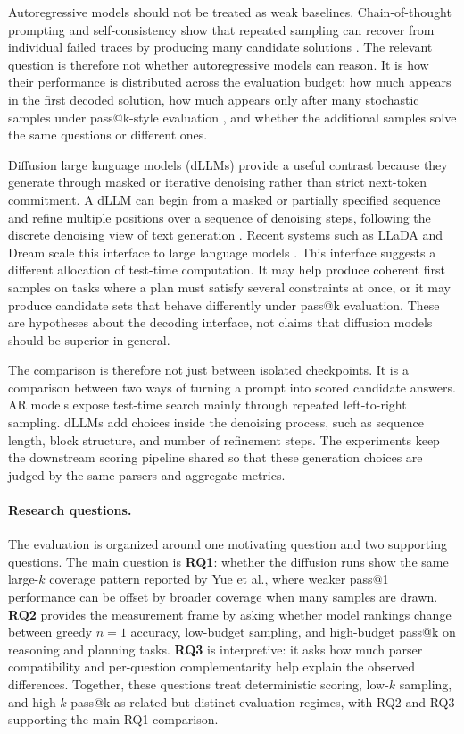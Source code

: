 Autoregressive models should not be treated as weak baselines. Chain-of-thought
prompting and self-consistency show that repeated sampling can recover from
individual failed traces by producing many candidate solutions
\cite{wei2022chain,wang2023selfconsistency}. The relevant question is therefore
not whether autoregressive models can reason. It is how their performance is
distributed across the evaluation budget: how much appears in the first decoded
solution, how much appears only after many stochastic samples under pass@k-style
evaluation \cite{chen2021humaneval}, and whether the additional samples solve
the same questions or different ones.

Diffusion large language models (dLLMs) provide a useful contrast because they
generate through masked or iterative denoising rather than strict next-token
commitment. A dLLM can begin from a masked or partially specified sequence and
refine multiple positions over a sequence of denoising steps, following the
discrete denoising view of text generation \cite{austin2021structured}. Recent
systems such as LLaDA and Dream scale this interface to large language models
\cite{nie2025llada,ye2025dream}. This interface suggests a different allocation
of test-time computation. It may help produce coherent first samples on tasks
where a plan must satisfy several constraints at once, or it may produce
candidate sets that behave differently under pass@k evaluation. These are
hypotheses about the decoding interface, not claims that diffusion models
should be superior in general.

The comparison is therefore not just between isolated checkpoints. It is a
comparison between two ways of turning a prompt into scored candidate answers.
AR models expose test-time search mainly through repeated left-to-right
sampling. dLLMs add choices inside the denoising process, such as sequence
length, block structure, and number of refinement steps. The experiments keep
the downstream scoring pipeline shared so that these generation choices are
judged by the same parsers and aggregate metrics.

\paragraph{Research questions.}
The evaluation is organized around one motivating question and two supporting
questions. The main question is \textbf{RQ1}: whether the diffusion runs show
the same large-$k$ coverage pattern reported by Yue et al., where weaker pass@1
performance can be offset by broader coverage when many samples are drawn.
\textbf{RQ2} provides the measurement frame by asking whether model rankings
change between greedy $n=1$ accuracy, low-budget sampling, and high-budget
pass@k on reasoning and planning tasks. \textbf{RQ3} is interpretive: it asks
how much parser compatibility and per-question complementarity help explain the
observed differences. Together, these questions treat deterministic scoring,
low-$k$ sampling, and high-$k$ pass@k as related but distinct evaluation
regimes, with RQ2 and RQ3 supporting the main RQ1 comparison.

